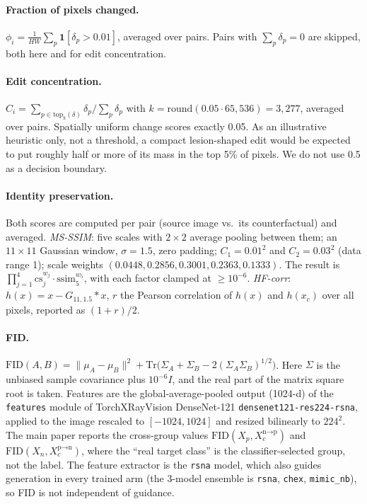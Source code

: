 \paragraph{Fraction of pixels changed.} $\phi_i = \frac{1}{HW}\sum_p \mathbf{1}[\delta_p > 0.01]$, averaged over pairs. Pairs with $\sum_p \delta_p = 0$ are skipped, both here and for edit concentration.

\paragraph{Edit concentration.} $C_i = \sum_{p \in \mathrm{top}_k(\delta)} \delta_p \big/ \sum_p \delta_p$ with $k = \mathrm{round}(0.05 \cdot 65{,}536) = 3{,}277$, averaged over pairs. Spatially uniform change scores exactly 0.05. As an illustrative heuristic only, not a threshold, a compact lesion-shaped edit would be expected to put roughly half or more of its mass in the top 5\% of pixels. We do not use 0.5 as a decision boundary.

\paragraph{Identity preservation.} Both scores are computed per pair (source image vs.\ its counterfactual) and averaged. \emph{MS-SSIM}: five scales with $2 \times 2$ average pooling between them; an $11 \times 11$ Gaussian window, $\sigma = 1.5$, zero padding; $C_1 = 0.01^2$ and $C_2 = 0.03^2$ (data range 1); scale weights $(0.0448, 0.2856, 0.3001, 0.2363, 0.1333)$. The result is $\prod_{j=1}^{4} \mathrm{cs}_j^{w_j} \cdot \mathrm{ssim}_5^{w_5}$, with each factor clamped at $\geq 10^{-6}$. \emph{HF-corr}: $h(x) = x - G_{11, 1.5} * x$, $r$ the Pearson correlation of $h(x)$ and $h(x_c)$ over all pixels, reported as $(1 + r)/2$.

\paragraph{FID.} $\mathrm{FID}(A, B) = \lVert \mu_A - \mu_B \rVert^2 + \mathrm{Tr}\big(\Sigma_A + \Sigma_B - 2(\Sigma_A \Sigma_B)^{1/2}\big)$. Here $\Sigma$ is the unbiased sample covariance plus $10^{-6} I$, and the real part of the matrix square root is taken. Features are the global-average-pooled output (1024-d) of the \texttt{features} module of TorchXRayVision DenseNet-121 \texttt{densenet121-res224-rsna}, applied to the image rescaled to $[-1024, 1024]$ and resized bilinearly to $224^2$. The main paper reports the cross-group values $\mathrm{FID}(X_p, X_c^{\text{n}\to\text{p}})$ and $\mathrm{FID}(X_n, X_c^{\text{p}\to\text{n}})$, where the ``real target class'' is the classifier-selected group, not the label. The feature extractor is the \texttt{rsna} model, which also guides generation in every trained arm (the 3-model ensemble is \texttt{rsna}, \texttt{chex}, \texttt{mimic\_nb}), so FID is not independent of guidance.

